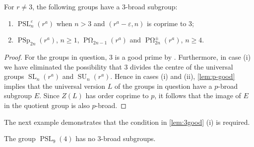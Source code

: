 \documentclass[12pt,a4paper]{amsart}
\DeclareMathOperator{\PSL}{PSL}
\DeclareMathOperator{\PSp}{PSp}
\DeclareMathOperator{\POmega}{P \Omega}
\DeclareMathOperator{\SL}{SL}
\DeclareMathOperator{\SU}{SU}
\renewcommand{\epsilon}{\varepsilon}
\newcommand{\eps}{\epsilon}
\begin{document}
\begin{lemma}\label{lem:3good} For $r\ne 3$, the following groups have a $3$-broad subgroup:
\begin{enumerate}
\item $\PSL_n^\epsilon(r^a)$ when $n> 3$ and $(r^a-\eps,n)$ is coprime to $3$;
\item $\PSp_{2n}(r^a)$, $n \ge 1$, $\POmega_{2n-1}(r^a)$ and $\POmega_{2n}^\pm(r^a)$, $n \ge 4$.
\end{enumerate}
\end{lemma}

\begin{proof} For the groups in question,   $3$ is a good prime by \cite[Table 1.8]{GLS3}. Furthermore, in case (i) we have eliminated the possibility that $3$ divides the centre of the universal  groups $\SL_n(r^a)$ and $\SU_n(r^a)$. Hence in cases (i) and (ii),  \cref{lem:p-good} implies that the universal version $L$ of the groups in question have a $p$-broad subgroup $E$.  Since $Z(L)$ has order coprime to $p$, it follows that the image of $E$ in the quotient group is also $p$-broad.
\end{proof}





The next example demonstrates that the condition in \cref{lem:3good} (i) is required.

\begin{example}
The group $\PSL_9(4)$ has no $3$-broad subgroups.
\end{example}
\end{document}
